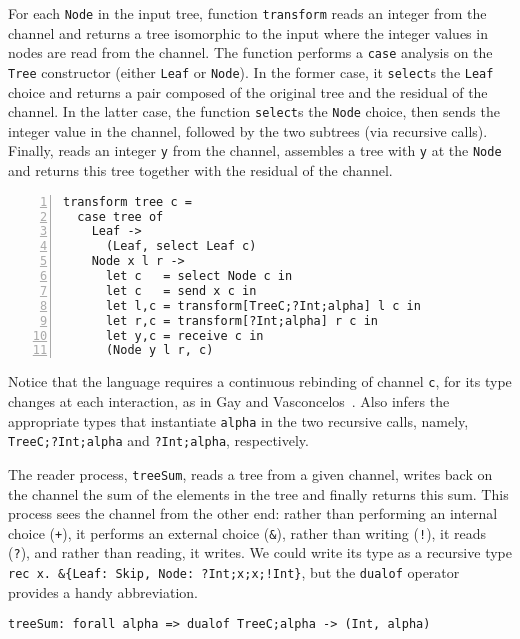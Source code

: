 For each \lstinline|Node| in the input tree, function
\lstinline|transform| reads an integer from the channel and returns a
tree isomorphic to the input where the integer values in nodes are
read from the channel.
%
The function performs a \lstinline|case| analysis on the
\lstinline|Tree| constructor (either \lstinline|Leaf| or
\lstinline|Node|). In the former case, it \lstinline|select|s the
\lstinline|Leaf| choice and returns a pair composed of the original
tree and the residual of the channel. In the latter case, the function
\lstinline|select|s the \lstinline|Node| choice, then sends the
integer value in the channel, followed by the two subtrees (via
recursive calls). Finally, reads an integer \lstinline|y| from the
channel, assembles a tree with \lstinline|y| at the \lstinline|Node|
and returns this tree together with the residual of the channel.
%
\begin{lstlisting}[numbers=left]
transform tree c =
  case tree of
    Leaf ->
      (Leaf, select Leaf c)
    Node x l r ->
      let c   = select Node c in
      let c   = send x c in
      let l,c = transform[TreeC;?Int;alpha] l c in
      let r,c = transform[?Int;alpha] r c in
      let y,c = receive c in
      (Node y l r, c)
\end{lstlisting}

Notice that the language requires a continuous rebinding of channel
\lstinline|c|, for its type changes at each interaction, as in Gay and
Vasconcelos~\cite{DBLP:journals/jfp/GayV10}. Also \freest{} infers the
appropriate types that instantiate \lstinline|alpha| in the two
recursive calls, namely, \lstinline|TreeC;?Int;alpha| and
\lstinline|?Int;alpha|, respectively.

The reader process, \lstinline|treeSum|, reads a tree from a given
channel, writes back on the channel the sum of the elements in the
tree and finally returns this sum. This process sees the channel from the
other end: rather than performing an internal choice (\lstinline|+|),
it performs an external choice (\lstinline|&|), rather than writing
(\lstinline|!|), it reads (\lstinline|?|), and rather than reading, it
writes. We could write its type as a recursive type
\lstinline|rec x. &{Leaf: Skip, Node: ?Int;x;x;!Int}|,
but the \lstinline|dualof| operator provides a handy abbreviation.
%
\begin{lstlisting}
treeSum: forall alpha => dualof TreeC;alpha -> (Int, alpha)
\end{lstlisting}

